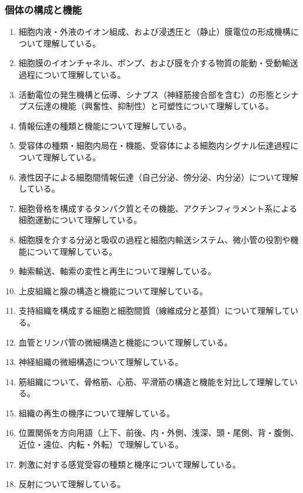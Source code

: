 \hypertarget{ux500bux4f53ux306eux69cbux6210ux3068ux6a5fux80fd}{%
\subsubsection{個体の構成と機能}\label{ux500bux4f53ux306eux69cbux6210ux3068ux6a5fux80fd}}

\begin{enumerate}
\def\labelenumi{\arabic{enumi}.}
\tightlist
\item
  細胞内液・外液のイオン組成、および浸透圧と（静止）膜電位の形成機構について理解している。
\item
  細胞膜のイオンチャネル、ポンプ、および膜を介する物質の能動・受動輸送過程について理解している。
\item
  活動電位の発生機構と伝導、シナプス（神経筋接合部を含む）の形態とシナプス伝達の機能（興奮性、抑制性）と可塑性について理解している。
\item
  情報伝達の種類と機能について理解している。
\item
  受容体の種類・細胞内局在・機能、受容体による細胞内シグナル伝達過程について理解している。
\item
  液性因子による細胞間情報伝達（自己分泌、傍分泌、内分泌）について理解している。
\item
  細胞骨格を構成するタンパク質とその機能、アクチンフィラメント系による細胞運動について理解している。
\item
  細胞膜を介する分泌と吸収の過程と細胞内輸送システム、微小管の役割や機能について理解している。
\item
  軸索輸送、軸索の変性と再生について理解している。
\item
  上皮組織と腺の構造と機能について理解している。
\item
  支持組織を構成する細胞と細胞間質（線維成分と基質）について理解している。
\item
  血管とリンパ管の微細構造と機能について理解している。
\item
  神経組織の微細構造について理解している。
\item
  筋組織について、骨格筋、心筋、平滑筋の構造と機能を対比して理解している。
\item
  組織の再生の機序について理解している。
\item
  位置関係を方向用語（上下、前後、内・外側、浅深、頭・尾側、背・腹側、近位・遠位、内転・外転）で理解している。
\item
  刺激に対する感覚受容の種類と機序について理解している。
\item
  反射について理解している。

\end{enumerate}
